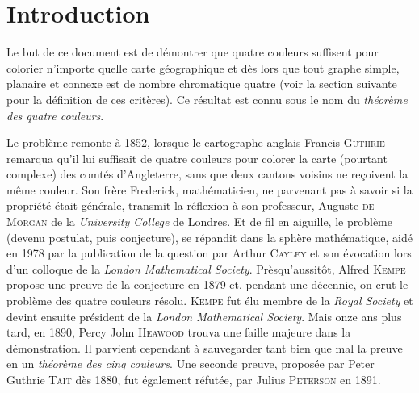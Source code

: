 

\chapter{Introduction}

\setcounter{page}{2}


Le but de ce document est de démontrer que quatre couleurs suffisent pour colorier n'importe quelle carte géographique et dès lors que tout graphe simple, planaire et connexe est de nombre chromatique quatre (voir la section suivante pour la définition de ces critères). Ce résultat est connu sous le nom du \textit{théorème des quatre couleurs}.\bigskip

Le problème remonte à 1852, lorsque le cartographe anglais Francis \textsc{Guthrie} remarqua qu'il lui suffisait de quatre couleurs pour colorer la carte (pourtant complexe) des comtés d'Angleterre, sans que deux cantons voisins ne reçoivent la même couleur. Son frère Frederick, mathématicien, ne parvenant pas à savoir si la propriété était générale, transmit la réflexion à son professeur, Auguste \textsc{de Morgan} de la \textit{University College} de Londres. Et de fil en aiguille, le problème (devenu postulat, puis conjecture), se répandit dans la sphère mathématique, aidé en 1978 par la publication de la question par Arthur \textsc{Cayley} et son évocation lors d'un colloque de la \textit{London Mathematical Society}. Prèsqu'aussitôt, Alfred \textsc{Kempe} propose une preuve de la conjecture en 1879 et, pendant une décennie, on crut le problème des quatre couleurs résolu. \textsc{Kempe} fut élu membre de la \textit{Royal Society} et devint ensuite président de la \textit{London Mathematical Society}. Mais onze ans plus tard, en 1890, Percy John \textsc{Heawood} trouva une faille majeure dans la démonstration. Il parvient cependant à sauvegarder tant bien que mal la preuve en un \textit{théorème des cinq couleurs}. Une seconde preuve, proposée par Peter Guthrie \textsc{Tait} dès 1880, fut également réfutée, par Julius \textsc{Peterson} en 1891.\smallskip

